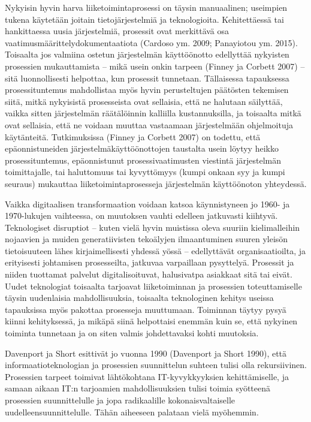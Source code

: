 \documentclass[
  finnish,
  letterpaper,
  DIV=11,
  numbers=noendperiod,
  oneside]{scrreprt}
\begin{document}
Nykyisin hyvin harva liiketoimintaprosessi on täysin manuaalinen;
useimpien tukena käytetään joitain tietojärjestelmiä ja teknologioita.
Kehitettäessä tai hankittaessa uusia järjestelmiä, prosessit ovat
merkittävä osa vaatimusmäärittelydokumentaatiota (Cardoso ym. 2009;
Panayiotou ym. 2015). Toisaalta jos valmiina ostetun järjestelmän
käyttöönotto edellyttää nykyisten prosessien mukauttamista -- mikä usein
onkin tarpeen (Finney ja Corbett 2007) -- sitä luonnollisesti helpottaa,
kun prosessit tunnetaan. Tällaisessa tapauksessa prosessituntemus
mahdollistaa myös hyvin perusteltujen päätösten tekemisen siitä, mitkä
nykyisistä prosesseista ovat sellaisia, että ne halutaan säilyttää,
vaikka sitten järjestelmän räätälöinnin kalliilla kustannuksilla, ja
toisaalta mitkä ovat sellaisia, että ne voidaan muuttaa vastaamaan
järjestelmään ohjelmoituja käytänteitä. Tutkimuksissa (Finney ja Corbett
2007) on todettu, että epäonnistuneiden järjestelmäkäyttöönottojen
taustalta usein löytyy heikko prosessituntemus, epäonnistunut
prosessivaatimusten viestintä järjestelmän toimittajalle, tai
haluttomuus tai kyvyttömyys (kumpi onkaan syy ja kumpi seuraus)
mukauttaa liiketoimintaprosesseja
järjestelmän käyttöönoton yhteydessä.

Vaikka digitaalisen transformaation voidaan katsoa käynnistyneen jo
1960- ja 1970-lukujen vaihteessa, on muutoksen vauhti edelleen
jatkuvasti kiihtyvä. Teknologiset disruptiot -- kuten vielä hyvin
muistissa oleva suuriin kielimalleihin nojaavien ja muiden
generatiivisten tekoälyjen ilmaantuminen suuren yleisön tietoisuuteen
lähes kirjaimellisesti yhdessä yössä -- edellyttävät organisaatioilta,
ja erityisesti johtamisen prosesseilta, jatkuvaa varpaillaan pysyttelyä.
Prosessit ja niiden tuottamat palvelut digitalisoituvat, halusivatpa
asiakkaat sitä tai eivät. Uudet teknologiat toisaalta tarjoavat
liiketoiminnan ja prosessien toteuttamiselle täysin uudenlaisia
mahdollisuuksia, toisaalta teknologinen kehitys useissa tapauksissa myös
pakottaa prosesseja muuttumaan. Toiminnan täytyy pysyä kiinni
kehityksessä, ja mikäpä siinä helpottaisi enemmän kuin se, että nykyinen
toiminta tunnetaan ja on siten valmis johdettavaksi kohti muutoksia.

Davenport ja Short esittivät jo vuonna 1990 (Davenport ja Short 1990),
että informaatioteknologian ja prosessien suunnittelun suhteen tulisi
olla rekursiivinen. Prosessien tarpeet toimivat lähtökohtana
IT-kyvykkyyksien kehittämiselle, ja samaan aikaan IT:n tarjoamien
mahdollisuuksien tulisi toimia syötteenä prosessien suunnittelulle ja
jopa radikaalille kokonaisvaltaiselle uudelleensuunnittelulle. Tähän
aiheeseen palataan vielä myöhemmin.
\end{document}
